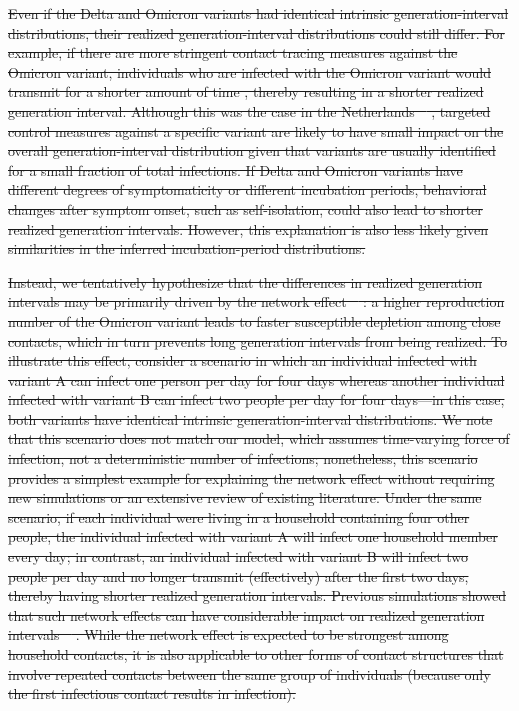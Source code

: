 \documentclass[12pt]{article}
\providecommand{\DIFdeltex}[1]{{\protect\color{red}\sout{#1}}}                      %
\providecommand{\DIFdel}[1]{\texorpdfstring{\DIFdeltex{#1}}{}} %
\begin{document}
\DIFdel{Even if the Delta and Omicron variants had identical intrinsic generation-interval distributions, their realized generation-interval distributions could still differ.
For example, if there are more stringent contact tracing measures against the Omicron variant, individuals who are infected with the Omicron variant would transmit for a shorter amount of time , thereby resulting in a shorter realized generation interval.
Although this was the case in the Netherlands \mbox{%
\citep{backer2021omicron}}\hspace{0pt}%
, targeted control measures against a specific variant are likely to have small impact on the overall generation-interval distribution given that variants are usually identified for a small fraction of total infections.
If Delta and Omicron variants have different degrees of symptomaticity or different incubation periods, behavioral changes after symptom onset, such as self-isolation, could also lead to shorter realized generation intervals.
However, this explanation is also less likely given similarities in the inferred incubation-period distributions.
}%

\DIFdel{Instead, we tentatively hypothesize that the differences in realized generation intervals may be primarily driven by the network effect \mbox{%
\citep{park2020inferring,hart2022generation}}\hspace{0pt}%
: a higher reproduction number of the Omicron variant leads to faster susceptible depletion among close contacts, which in turn prevents long generation intervals from being realized. 
To illustrate this effect, consider a scenario in which an individual infected with variant A can infect one person per day for four days whereas another individual infected with variant B can infect two people per day for four days---in this case, both variants have identical intrinsic generation-interval distributions.
We note that this scenario does not match our model, which assumes time-varying force of infection, not a deterministic number of infections; nonetheless, this scenario provides a simplest example for explaining the network effect without requiring new simulations or an extensive review of existing literature.
Under the same scenario, if each individual were living in a household containing four other people, the individual infected with variant A will infect one household member every day; in contrast, an individual infected with variant B will infect two people per day and no longer transmit (effectively) after the first two days, thereby having shorter realized generation intervals.
Previous simulations showed that such network effects can have considerable impact on realized generation intervals \mbox{%
\citep{park2020inferring}}\hspace{0pt}%
.
While the network effect is expected to be strongest among household contacts, it is also applicable to other forms of contact structures that involve repeated contacts between the same group of individuals (because only the first infectious contact results in infection).
}%
\end{document}
